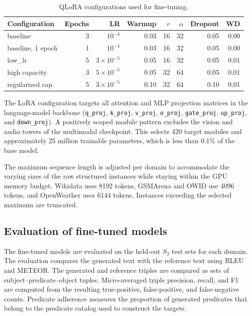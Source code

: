 \begin{table}[!htbp]
\centering
\caption{QLoRA configurations used for fine-tuning.}
\label{tab:qlora-config}
\begin{tabular}{lrrrrrrr}
\hline
\textbf{Configuration} & \textbf{Epochs} & \textbf{LR} & \textbf{Warmup} & \textbf{$r$} & \textbf{$\alpha$} & \textbf{Dropout} & \textbf{WD} \\
\hline
baseline & 3 & $10^{-4}$ & 0.03 & 16 & 32 & 0.05 & 0.00 \\
baseline, 1 epoch & 1 & $10^{-4}$ & 0.03 & 16 & 32 & 0.05 & 0.00 \\
low\_lr & 5 & $3\times10^{-5}$ & 0.05 & 16 & 32 & 0.05 & 0.01 \\
high capacity & 3 & $5\times10^{-5}$ & 0.05 & 32 & 64 & 0.05 & 0.01 \\
regularized cap. & 5 & $3\times10^{-5}$ & 0.10 & 32 & 64 & 0.10 & 0.01 \\
\hline
\end{tabular}
\end{table}

The LoRA configuration targets all attention and MLP projection matrices in
the language-model backbone (\texttt{q\_proj}, \texttt{k\_proj},
\texttt{v\_proj}, \texttt{o\_proj}, \texttt{gate\_proj}, \texttt{up\_proj},
and \texttt{down\_proj}). A positively scoped module pattern excludes the
vision and audio towers of the multimodal checkpoint. This selects 420 target
modules and approximately 25 million trainable parameters, which is less than
0.1\% of the base model.

The maximum sequence length is adjusted per domain to accommodate the varying
sizes of the raw structured instances while staying within the GPU memory
budget. Wikidata uses 8192 tokens, GSMArena and OWID use 4096 tokens, and
OpenWeather uses 6144 tokens. Instances exceeding the selected maximum are
truncated.

\subsection{Evaluation of fine-tuned models}

The fine-tuned models are evaluated on the held-out $S_2$ test sets for each
domain. The evaluation compares the generated text with the reference text
using BLEU and METEOR. The generated and reference triples are compared as
sets of subject--predicate--object tuples. Micro-averaged triple precision,
recall, and F1 are computed from the resulting true-positive, false-positive,
and false-negative counts. Predicate adherence measures the proportion of
generated predicates that belong to the predicate catalog used to construct
the targets.

